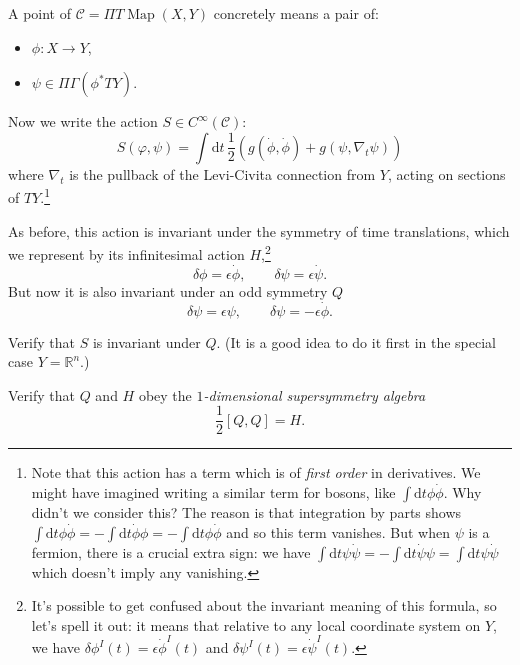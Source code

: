 \documentclass[12pt,letterpaper,reqno]{article}
\numberwithin{equation}{section}
\newcommand{\cC}{\ensuremath{\mathcal C}}
\newcommand{\R}{\ensuremath{\mathbb R}}
\newcommand{\half}{\ensuremath{\frac{1}{2}}}
\newcommand{\de}{\mathrm{d}}
\newcommand{\eps}{\epsilon}
\newcommand{\ti}[1]{\textit{#1}}
\DeclareMathOperator{\Map}{Map}
\begin{document}
A point of $\cC = \Pi T \Map(X,Y)$ concretely means a pair of:
\begin{itemize}
 \item $\phi: X \to Y$,
 \item $\psi \in \Pi \Gamma(\phi^* TY)$.
\end{itemize}

Now we write the action $S \in C^\infty(\cC)$:
\begin{equation}
  S(\varphi,\psi) = \int \de t \, \half(g(\dot \phi, \dot \phi) + g(\psi, \nabla_t \psi))
\end{equation}
where $\nabla_t$ is the pullback of the Levi-Civita connection from $Y$, acting
on sections of $TY$.\footnote{Note that this action has a term which is of \ti{first order}
in derivatives. We might have imagined writing a similar term for bosons, 
like $\int \de t \phi \dot\phi$. Why didn't we consider this? The reason is that
integration by parts shows
 $\int \de t \phi \dot\phi = - \int \de t \dot\phi \phi = - \int \de t \phi \dot\phi$
and so this term vanishes. But when $\psi$ is a fermion, there is a crucial extra sign:
we have
 $\int \de t \psi \dot\psi = - \int \de t \dot\psi \psi = \int \de t \psi \dot\psi$
which doesn't imply any vanishing.}

As before, this action is invariant under the symmetry of time translations,
which we represent by its infinitesimal action $H$,\footnote{It's possible to 
get confused about the invariant meaning of this formula, so let's spell it out:
it means that relative to any local coordinate system on $Y$, we have
$\delta \phi^I(t) = \eps \dot\phi^I(t)$ and $\delta \psi^I(t) = \eps \dot \psi^I(t)$.}
\begin{equation}
  \delta \phi = \eps \dot\phi, \qquad \delta \psi = \eps \dot\psi.
\end{equation}
But now it is also invariant under an odd symmetry $Q$
\begin{equation}
  \delta \psi = \eps \psi, \qquad \delta \psi = - \eps \dot\phi.
\end{equation}

\begin{exercise}
Verify that $S$ is invariant under $Q$. (It is a good idea
to do it first in the special case $Y = \R^n$.)
\end{exercise}

\begin{exercise}
Verify that $Q$ and $H$ obey the \ti{$1$-dimensional supersymmetry algebra}
\begin{equation}
  \half [Q,Q] = H.
\end{equation}
\end{exercise}
\end{document}
